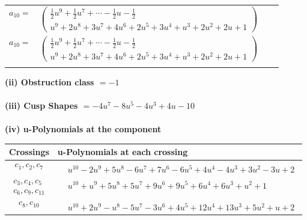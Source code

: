 \documentclass[1p]{elsarticle_modified}
\theoremstyle{definition}
\begin{document}
\begin{tabular}{m{7pt} m{180pt} m{7pt} m{180pt} }
\flushright $a_{10}=$&$\begin{pmatrix}\frac{1}{2} u^9+\frac{1}{2} u^7+\cdots-\frac{1}{2} u-\frac{1}{2}\\u^9+2 u^8+3 u^7+4 u^6+2 u^5+3 u^4+u^3+2 u^2+2 u+1\end{pmatrix}$\\ \flushright $a_{10}=$&$\begin{pmatrix}\frac{1}{2} u^9+\frac{1}{2} u^7+\cdots-\frac{1}{2} u-\frac{1}{2}\\u^9+2 u^8+3 u^7+4 u^6+2 u^5+3 u^4+u^3+2 u^2+2 u+1\end{pmatrix}$\\&\end{tabular}
\flushleft \textbf{(ii) Obstruction class $= -1$}\\~\\
\flushleft \textbf{(iii) Cusp Shapes $= -4 u^7-8 u^5-4 u^3+4 u-10$}\\~\\
\newpage\renewcommand{\arraystretch}{1}
\flushleft \textbf{(iv) u-Polynomials at the component}\newline \\
\begin{tabular}{m{50pt}|m{274pt}}
Crossings & \hspace{64pt}u-Polynomials at each crossing \\
\hline $$\begin{aligned}c_{1},c_{2},c_{7}\end{aligned}$$&$\begin{aligned}
&u^{10}-2 u^9+5 u^8-6 u^7+7 u^6-6 u^5+4 u^4-4 u^3+3 u^2-3 u+2
\end{aligned}$\\
\hline $$\begin{aligned}c_{3},c_{4},c_{5}\\c_{6},c_{9},c_{11}\end{aligned}$$&$\begin{aligned}
&u^{10}+u^9+5 u^8+5 u^7+9 u^6+9 u^5+6 u^4+6 u^3+u^2+1
\end{aligned}$\\
\hline $$\begin{aligned}c_{8},c_{10}\end{aligned}$$&$\begin{aligned}
&u^{10}+2 u^9- u^8-5 u^7-3 u^6+4 u^5+12 u^4+13 u^3+5 u^2+u+2
\end{aligned}$\\
\hline
\end{tabular}\\~\\
\end{document}

